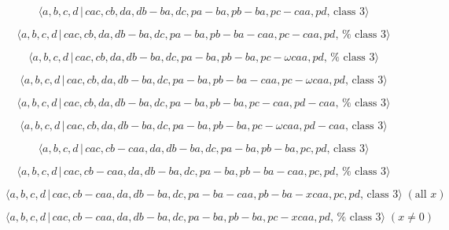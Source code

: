 \documentclass[10pt]{article}
\begin{document}
\begin{equation}
\langle a,b,c,d\,|\,cac,cb,da,db-ba,dc,pa-ba,pb-ba,pc-caa,pd,\,\text{class }%
3\rangle  \tag{7.4262}
\end{equation}

\begin{equation}
\langle a,b,c,d\,|\,cac,cb,da,db-ba,dc,pa-ba,pb-ba-caa,pc-caa,pd,\,\text{%
class }3\rangle  \tag{7.4263}
\end{equation}

\begin{equation}
\langle a,b,c,d\,|\,cac,cb,da,db-ba,dc,pa-ba,pb-ba,pc-\omega caa,pd,\,\text{%
class }3\rangle  \tag{7.4264}
\end{equation}

\begin{equation}
\langle a,b,c,d\,|\,cac,cb,da,db-ba,dc,pa-ba,pb-ba-caa,pc-\omega caa,pd,\,%
\text{class }3\rangle  \tag{7.4265}
\end{equation}

\begin{equation}
\langle a,b,c,d\,|\,cac,cb,da,db-ba,dc,pa-ba,pb-ba,pc-caa,pd-caa,\,\text{%
class }3\rangle  \tag{7.4266}
\end{equation}

\begin{equation}
\langle a,b,c,d\,|\,cac,cb,da,db-ba,dc,pa-ba,pb-ba,pc-\omega caa,pd-caa,\,%
\text{class }3\rangle  \tag{7.4267}
\end{equation}

\begin{equation}
\langle a,b,c,d\,|\,cac,cb-caa,da,db-ba,dc,pa-ba,pb-ba,pc,pd,\,\text{class }%
3\rangle  \tag{7.4268}
\end{equation}

\begin{equation}
\langle a,b,c,d\,|\,cac,cb-caa,da,db-ba,dc,pa-ba,pb-ba-caa,pc,pd,\,\text{%
class }3\rangle  \tag{7.4269}
\end{equation}

\begin{equation}
\langle a,b,c,d\,|\,cac,cb-caa,da,db-ba,dc,pa-ba-caa,pb-ba-xcaa,pc,pd,\,%
\text{class }3\rangle \;(\text{all }x)  \tag{7.4270}
\end{equation}

\begin{equation}
\langle a,b,c,d\,|\,cac,cb-caa,da,db-ba,dc,pa-ba,pb-ba,pc-xcaa,pd,\,\text{%
class }3\rangle \;(x \neq 0)  \tag{7.4271}
\end{equation}
\end{document}
